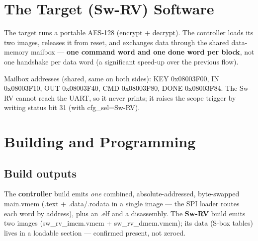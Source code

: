 \documentclass[11pt,a4paper]{report}
\newcommand{\code}[1]{{\ttfamily\small #1}}
\begin{document}
\chapter{The Target (Sw-RV) Software}
The target runs a portable AES-128 (encrypt + decrypt). The controller loads its
two images, releases it from reset, and exchanges data through the shared
data-memory mailbox --- \textbf{one command word and one done word per block},
not one handshake per data word (a significant speed-up over the previous flow).

\begin{center}
\end{center}
Mailbox addresses (shared, same on both sides): \code{KEY 0x08003F00},
\code{IN 0x08003F10}, \code{OUT 0x08003F40}, \code{CMD 0x08003F80},
\code{DONE 0x08003F84}. The Sw-RV cannot reach the UART, so it never prints; it
raises the scope trigger by writing status bit 31 (with \code{cfg\_sel}=Sw-RV).

\chapter{Building and Programming}
\section{Build outputs}
The \textbf{controller} build emits \emph{one} combined, absolute-addressed,
byte-swapped \code{main.vmem} (\code{.text} + \code{.data}/\code{.rodata} in a
single image --- the SPI loader routes each word by address), plus an
\code{.elf} and a disassembly. The \textbf{Sw-RV} build emits two images
(\code{sw\_rv\_imem.vmem} + \code{sw\_rv\_dmem.vmem}); its data (S-box tables)
lives in a loadable section --- confirmed present, not zeroed.
\end{document}
